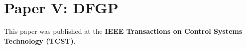 \documentclass[
10pt, %
b5paper, %
twoside, %
openright  %
]{book}  %
\begin{document}



\chapter*{Paper V: DFGP}
\vspace{1cm}
This paper was published at the \textbf{IEEE Transactions on Control Systems Technology (TCST)}.







% 
% 



% 
% 
% 

%  




\end{document}
